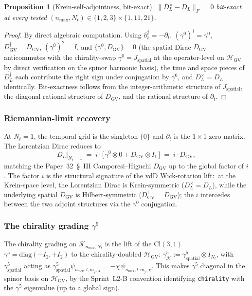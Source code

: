 \documentclass[11pt,a4paper]{article}
\theoremstyle{plain}
\newtheorem{proposition}[theorem]{Proposition}
\theoremstyle{definition}
\newcommand{\nmax}{n_{\max}}
\newcommand{\Nt}{N_t}
\newcommand{\Hilb}{\mathcal{H}}
\newcommand{\Krein}{\mathcal{K}}
\newcommand{\Frob}[1]{\lVert #1 \rVert_{F}}
\newcommand{\DGV}{D_{\mathrm{GV}}}
\newcommand{\DL}{D_{L}}
\newcommand{\Cl}{\mathrm{Cl}}
\begin{document}
\begin{proposition}[Krein-self-adjointness, bit-exact]
\label{prop:krein_self_adjoint}
$\Frob{\DL^\times - \DL} = 0$ bit-exact at every tested $(\nmax, \Nt)
\in \{1, 2, 3\} \times \{1, 11, 21\}$.
\end{proposition}

\begin{proof}
By direct algebraic computation. Using $\partial_t^\dagger = -\partial_t$,
$(\gamma^0)^\dagger = \gamma^0$, $\DGV^\dagger = \DGV$, $(\gamma^0)^2 =
I$, and $\{\gamma^0, \DGV\} = 0$ (the spatial Dirac
$\DGV$ anticommutes with the chirality-swap $\gamma^0 = J_{\mathrm{spatial}}$ at the
operator-level on $\Hilb_{\mathrm{GV}}$ by direct verification on the
spinor harmonic basis), the time and space pieces of $\DL^\dagger$
each contribute the right sign under conjugation by $\gamma^0$, and
$\DL^\times = \DL$ identically. Bit-exactness follows from the
integer-arithmetic structure of $J_{\mathrm{spatial}}$, the diagonal
rational structure of $\DGV$, and the rational structure of
$\partial_t$.
\end{proof}

\subsubsection{Riemannian-limit recovery}

At $\Nt = 1$, the temporal grid is the singleton $\{0\}$ and
$\partial_t$ is the $1 \times 1$ zero matrix. The Lorentzian Dirac
reduces to
\begin{equation}\label{eq:DL_riemannian_limit}
   \DL\big|_{\Nt = 1}
   \;=\; i \cdot \bigl[\,\gamma^0 \otimes 0 + \DGV \otimes I_1\,\bigr]
   \;=\; i \cdot \DGV,
\end{equation}
matching the Paper~32~\S~III Camporesi--Higuchi $\DGV$ up to the global
factor of $i$. The factor $i$ is the structural signature of the
vdD Wick-rotation lift:\ at the Krein-space level, the Lorentzian Dirac
is Krein-symmetric ($\DL^\times = \DL$), while the underlying spatial
$\DGV$ is Hilbert-symmetric ($\DGV^\dagger = \DGV$); the $i$ intercedes
between the two adjoint structures via the $\gamma^0$ conjugation.

\subsubsection{The chirality grading $\gamma^5$}

The chirality grading on $\Krein_{\nmax, \Nt}$ is the lift of the
$\Cl(3, 1)$ $\gamma^5 = \mathrm{diag}(-I_2, +I_2)$ to the
chirality-doubled $\Hilb_{\mathrm{GV}}$:
$\gamma^5_{\Krein} := \gamma^5_{\mathrm{spatial}} \otimes I_{\Nt}$,
with $\gamma^5_{\mathrm{spatial}}$ acting as
$\gamma^5_{\mathrm{spatial}} \psi_{n_\text{fock}, l, m_j, \chi} =
-\chi\, \psi_{n_\text{fock}, l, m_j, \chi}$. This makes $\gamma^5$
diagonal in the spinor basis on $\Hilb_{\mathrm{GV}}$, by the
Sprint~L2-B convention identifying \texttt{chirality} with the
$\gamma^5$ eigenvalue (up to a global sign).
\end{document}
